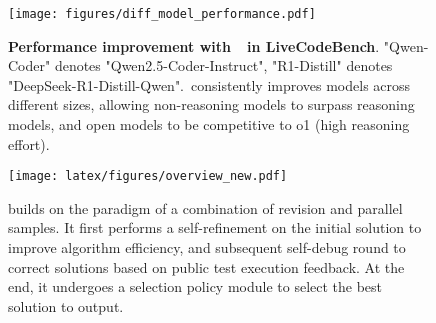 \begin{figure}[!t]
    \centering
    \texttt{[image: figures/diff\_model\_performance.pdf]}      \caption{\textbf{Performance improvement with~\frameworkname~in LiveCodeBench}. "Qwen-Coder" denotes "Qwen2.5-Coder-Instruct", "R1-Distill" denotes "DeepSeek-R1-Distill-Qwen".~\frameworkname consistently improves models across different sizes, allowing non-reasoning models to surpass reasoning models, and open models to be competitive to o1 (high reasoning effort).}%
    \label{fig:all_models_performance}
\end{figure}


\begin{figure*}[!t]
    \centering
    \texttt{[image: latex/figures/overview\_new.pdf]}
\caption{\frameworkname builds on the paradigm of a combination of revision and parallel samples. 
It first performs a self-refinement on the initial solution to improve algorithm efficiency, and subsequent self-debug round to correct solutions based on public test execution feedback. At the end, it undergoes a selection policy module to select the best solution to output.
}
\label{fig:Design}
\end{figure*}

